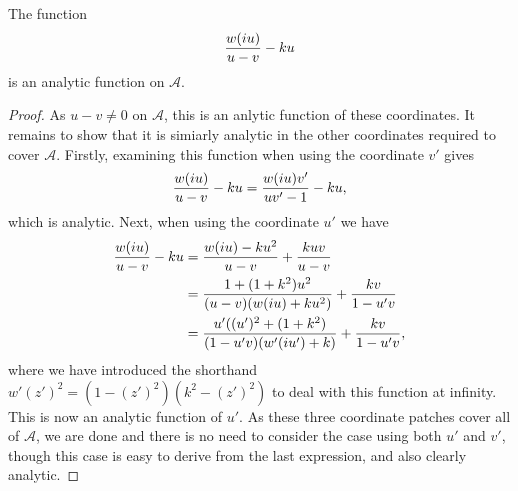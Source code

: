 \begin{lem}
The function
\[
\frac{w(i u)}{u-v} - ku
\]
is an analytic function on $\mathcal{A}$.

\begin{proof}
As $u-v \neq 0$ on $\mathcal{A}$, this is an anlytic function of these coordinates. It remains to show that it is simiarly analytic in the other coordinates required to cover $\mathcal{A}$. Firstly, examining this function when using the coordinate $v'$ gives
\[
\frac{w(i u)}{u-v} - ku = \frac{w(i u)v'}{uv'-1} - ku,
\]
which is analytic. Next, when using the coordinate $u'$ we have
\begin{align}
\frac{w(i u)}{u-v} - k u
&= \frac{w(i u) - ku^2}{u-v} + \frac{kuv}{u-v} \\
&= \frac{1 + (1+k^2)u^2}{(u-v) (w(i u) + ku^2)} + \frac{kv}{1-u'v} \\
&= \frac{u'((u')^2 + (1+k^2)} {(1-u'v) (w'(i u') + k)} + \frac{kv}{1-u'v},
\end{align}
where we have introduced the shorthand $w'(z')^2 = (1-(z')^2)(k^2 - (z')^2)$ to deal with this function at infinity. This is now an analytic function of $u'$. As these three coordinate patches cover all of $\mathcal{A}$, we are done and there is no need to consider the case using both $u'$ and $v'$, though this case is easy to derive from the last expression, and also clearly analytic.
\end{proof}
\end{lem}

